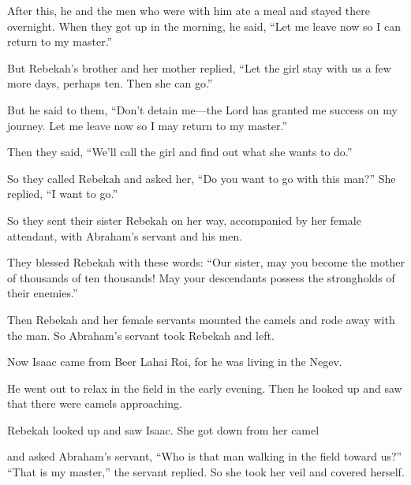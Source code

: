 \begin{scripture}
 After this, he and the men who were with him ate a meal and stayed there overnight. When they got up in the morning, he said, ``Let me leave now so I can return to my master.''
 But Rebekah's brother and her mother replied, ``Let the girl stay with us a few more days, perhaps ten. Then she can go.''
 But he said to them, ``Don't detain me---the Lord has granted me success on my journey. Let me leave now so I may return to my master.''
 Then they said, ``We'll call the girl and find out what she wants to do.''
 So they called Rebekah and asked her, ``Do you want to go with this man?'' She replied, ``I want to go.''
\everypar{}

 So they sent their sister Rebekah on her way, accompanied by her female attendant, with Abraham's servant and his men.
\everypar{}

 They blessed Rebekah with these words: ``Our sister, may you become the mother of thousands of ten thousands! May your descendants possess the strongholds of their enemies.''
\everypar{}

 Then Rebekah and her female servants mounted the camels and rode away with the man. So Abraham's servant took Rebekah and left.
\everypar{}

 Now Isaac came from Beer Lahai Roi, for he was living in the Negev.
 He went out to relax in the field in the early evening. Then he looked up and saw that there were camels approaching.
 Rebekah looked up and saw Isaac. She got down from her camel
 and asked Abraham's servant, ``Who is that man walking in the field toward us?'' ``That is my master,'' the servant replied. So she took her veil and covered herself.
\everypar{}


\end{scripture}

